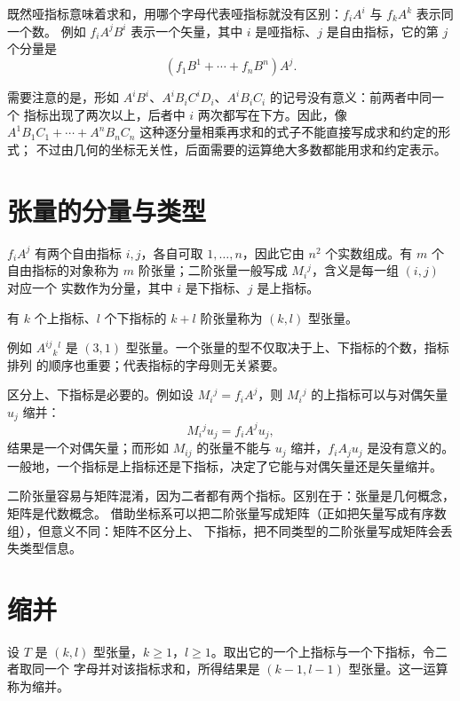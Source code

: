 既然哑指标意味着求和，用哪个字母代表哑指标就没有区别：$f_iA^i$ 与 $f_kA^k$ 表示同一个数。
例如 $f_iA^jB^i$ 表示一个矢量，其中 $i$ 是哑指标、$j$ 是自由指标，它的第 $j$ 个分量是
\[
(f_1B^1+\cdots+f_nB^n)A^j .
\]

需要注意的是，形如 $A^iB^i$、$A^iB_iC^iD_i$、$A^iB_iC_i$ 的记号没有意义：前两者中同一个
指标出现了两次以上，后者中 $i$ 两次都写在下方。因此，像
$A^1B_1C_1+\cdots+A^nB_nC_n$ 这种逐分量相乘再求和的式子不能直接写成求和约定的形式；
不过由几何的坐标无关性，后面需要的运算绝大多数都能用求和约定表示。

\section{张量的分量与类型}

$f_iA^j$ 有两个自由指标 $i,j$，各自可取 $1,\dots,n$，因此它由 $n^2$ 个实数组成。有 $m$ 个
自由指标的对象称为 $m$ 阶张量；二阶张量一般写成 $M_i{}^j$，含义是每一组 $(i,j)$ 对应一个
实数作为分量，其中 $i$ 是下指标、$j$ 是上指标。

\begin{definition}[(k,l) 型张量]
有 $k$ 个上指标、$l$ 个下指标的 $k+l$ 阶张量称为 $(k,l)$ 型张量。
\end{definition}

例如 $A^{ij}{}_k{}^l$ 是 $(3,1)$ 型张量。一个张量的型不仅取决于上、下指标的个数，指标排列
的顺序也重要；代表指标的字母则无关紧要。

区分上、下指标是必要的。例如设 $M_i{}^j=f_iA^j$，则 $M_i{}^j$ 的上指标可以与对偶矢量
$u_j$ 缩并：
\[
M_i{}^ju_j=f_iA^ju_j ,
\]
结果是一个对偶矢量；而形如 $M_{ij}$ 的张量不能与 $u_j$ 缩并，$f_iA_ju_j$ 是没有意义的。
一般地，一个指标是上指标还是下指标，决定了它能与对偶矢量还是矢量缩并。

二阶张量容易与矩阵混淆，因为二者都有两个指标。区别在于：张量是几何概念，矩阵是代数概念。
借助坐标系可以把二阶张量写成矩阵（正如把矢量写成有序数组），但意义不同：矩阵不区分上、
下指标，把不同类型的二阶张量写成矩阵会丢失类型信息。

\section{缩并}

\begin{definition}[缩并]
设 $T$ 是 $(k,l)$ 型张量，$k\ge1$，$l\ge1$。取出它的一个上指标与一个下指标，令二者取同一个
字母并对该指标求和，所得结果是 $(k-1,l-1)$ 型张量。这一运算称为缩并。
\end{definition}

